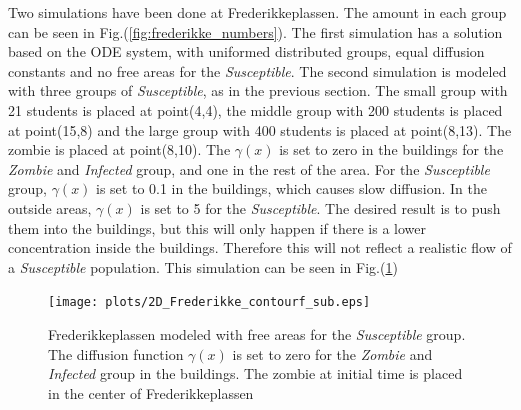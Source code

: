 \documentclass[%
twoside,                 %
final,                   %
10pt]{article}
\begin{document}
\vspace{3mm}




\vspace{3mm}


Two simulations have been done at Frederikkeplassen. The amount in each group can be seen in Fig.(\ref{fig:frederikke_numbers}). The first simulation has a solution based on the ODE system, with uniformed distributed groups, equal diffusion constants and no free areas for the \emph{Susceptible}. The second simulation is modeled with three groups of \emph{Susceptible}, as in the previous section. The small group with 21 students is placed at point(4,4), the middle group with 200 students is placed at point(15,8) and the large group with 400 students is placed at point(8,13). The zombie is placed at point(8,10). The $\gamma(x)$ is set to zero in the buildings for the \emph{Zombie} and \emph{Infected} group, and one in the rest of the area. For the \emph{Susceptible} group, $\gamma(x)$ is set to 0.1 in the buildings, which causes slow diffusion. In the outside areas, $\gamma(x)$ is set to 5 for the \emph{Susceptible}. The desired result is to push them into the buildings, but this will only happen if there is a lower concentration inside the buildings. Therefore this will not reflect a realistic flow of a \emph{Susceptible} population. This simulation can be seen in Fig.(\ref{fig:frederikke_free_area})  


\begin{figure}[ht]
  \centerline{\texttt{[image: plots/2D\_Frederikke\_contourf\_sub.eps]}}
  \caption{
  \label{fig:frederikke_free_area} Frederikkeplassen modeled with free areas for the \emph{Susceptible} group. The diffusion function $\gamma(x)$ is set to zero for the \emph{Zombie} and \emph{Infected} group in the buildings. The zombie at initial time is placed in the center of Frederikkeplassen
  }
\end{figure}




\vspace{3mm}




\vspace{3mm}
\end{document}
